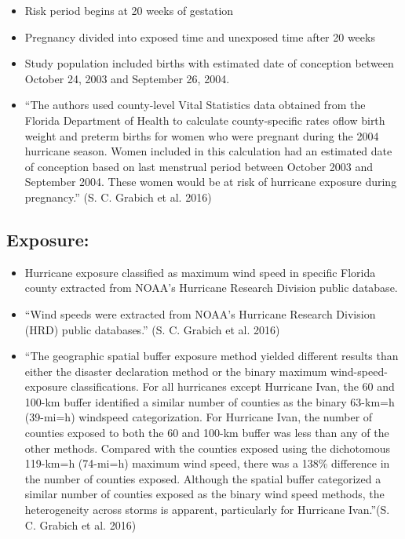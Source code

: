 \documentclass[
]{article}
\providecommand{\tightlist}{%
  \setlength{\itemsep}{0pt}\setlength{\parskip}{0pt}}
\begin{document}
\begin{itemize}
\tightlist
\item
  Risk period begins at 20 weeks of gestation
\item
  Pregnancy divided into exposed time and unexposed time after 20 weeks
\item
  Study population included births with estimated date of conception
  between October 24, 2003 and September 26, 2004.
\item
  ``The authors used county-level Vital Statistics data obtained from
  the Florida Department of Health to calculate county-specific rates
  oflow birth weight and preterm births for women who were pregnant
  during the 2004 hurricane season. Women included in this calculation
  had an estimated date of conception based on last menstrual period
  between October 2003 and September 2004. These women would be at risk
  of hurricane exposure during pregnancy.'' (S. C. Grabich et al. 2016)
\end{itemize}

\hypertarget{exposure-4}{%
\subsection{Exposure:}\label{exposure-4}}

\begin{itemize}
\tightlist
\item
  Hurricane exposure classified as maximum wind speed in specific
  Florida county extracted from NOAA's Hurricane Research Division
  public database.
\item
  ``Wind speeds were extracted from NOAA's Hurricane Research Division
  (HRD) public databases.'' (S. C. Grabich et al. 2016)
\item
  ``The geographic spatial buffer exposure method yielded different
  results than either the disaster declaration method or the binary
  maximum wind-speed-exposure classifications. For all hurricanes except
  Hurricane Ivan, the 60 and 100-km buffer identified a similar number
  of counties as the binary 63-km=h (39-mi=h) windspeed categorization.
  For Hurricane Ivan, the number of counties exposed to both the 60 and
  100-km buffer was less than any of the other methods. Compared with
  the counties exposed using the dichotomous 119-km=h (74-mi=h) maximum
  wind speed, there was a 138\% difference in the number of counties
  exposed. Although the spatial buffer categorized a similar number of
  counties exposed as the binary wind speed methods, the heterogeneity
  across storms is apparent, particularly for Hurricane Ivan.''(S. C.
  Grabich et al. 2016)
\end{itemize}
\end{document}

